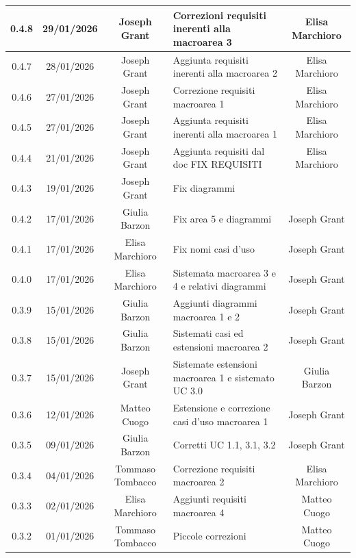 \documentclass[11pt,a4paper]{article}
\begin{document}
\begin{longtable}[H]{|c|c|c|>{\raggedright\arraybackslash}p{}|c|}
        \hline
        0.4.8 & 29/01/2026 & Joseph Grant & Correzioni requisiti inerenti alla macroarea 3 & Elisa Marchioro\\
        \hline
        0.4.7 & 28/01/2026 & Joseph Grant & Aggiunta requisiti inerenti alla macroarea 2 & Elisa Marchioro\\
        \hline
        0.4.6 & 27/01/2026 & Joseph Grant & Correzione requisiti macroarea 1 & Elisa Marchioro\\
        \hline
        0.4.5 & 27/01/2026 & Joseph Grant & Aggiunta requisiti inerenti alla macroarea 1 & Elisa Marchioro\\
        \hline
        0.4.4 & 21/01/2026 & Joseph Grant & Aggiunta requisiti dal doc FIX REQUISITI & Elisa Marchioro \\
        \hline
        0.4.3 & 19/01/2026 & Joseph Grant & Fix diagrammi &  \\
        \hline
        0.4.2 & 17/01/2026 & Giulia Barzon & Fix area 5 e diagrammi & Joseph Grant \\
        \hline
        0.4.1 & 17/01/2026 & Elisa Marchioro & Fix nomi casi d'uso & Joseph Grant \\
        \hline
        0.4.0 & 17/01/2026 & Elisa Marchioro & Sistemata macroarea 3 e 4 e relativi diagrammi & Joseph Grant \\
        \hline
        0.3.9 & 15/01/2026 & Giulia Barzon & Aggiunti diagrammi macroarea 1 e 2 & Joseph Grant \\
        \hline
        0.3.8 & 15/01/2026 & Giulia Barzon & Sistemati casi ed estensioni macroarea 2 & Joseph Grant \\
        \hline
        0.3.7 & 15/01/2026 & Joseph Grant & Sistemate estensioni macroarea 1 e sistemato UC 3.0 & Giulia Barzon\\
        \hline
        0.3.6 & 12/01/2026 & Matteo Cuogo & Estensione e correzione casi d'uso macroarea 1 & Joseph Grant\\
        \hline
        0.3.5 & 09/01/2026 & Giulia Barzon & Corretti UC 1.1, 3.1, 3.2 & Joseph Grant\\
        \hline
        0.3.4 & 04/01/2026 & Tommaso Tombacco & Correzione requisiti macroarea 2 & Elisa Marchioro\\
        \hline
        0.3.3 & 02/01/2026 & Elisa Marchioro & Aggiunti requisiti macroarea 4 &  Matteo Cuogo\\
        \hline
        0.3.2 & 01/01/2026 & Tommaso Tombacco & Piccole correzioni & Matteo Cuogo\\

\end{longtable}
\end{document}
